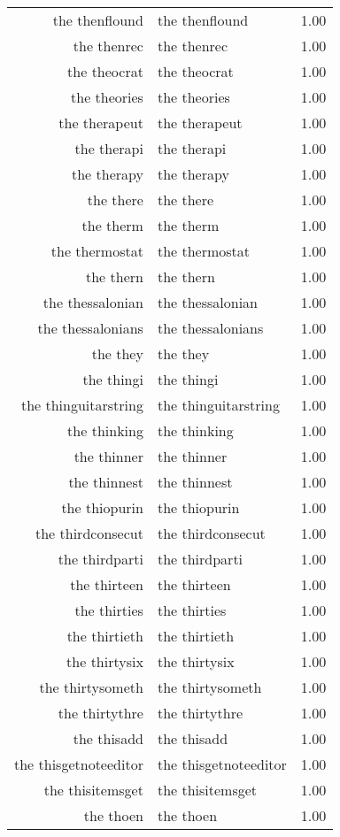 \begin{table}[ht]
\begin{tabular}{rlr}
  the thenflound & the thenflound & 1.00 \\ 
  the thenrec & the thenrec & 1.00 \\ 
  the theocrat & the theocrat & 1.00 \\ 
  the theories & the theories & 1.00 \\ 
  the therapeut & the therapeut & 1.00 \\ 
  the therapi & the therapi & 1.00 \\ 
  the therapy & the therapy & 1.00 \\ 
  the there & the there & 1.00 \\ 
  the therm & the therm & 1.00 \\ 
  the thermostat & the thermostat & 1.00 \\ 
  the thern & the thern & 1.00 \\ 
  the thessalonian & the thessalonian & 1.00 \\ 
  the thessalonians & the thessalonians & 1.00 \\ 
  the they & the they & 1.00 \\ 
  the thingi & the thingi & 1.00 \\ 
  the thinguitarstring & the thinguitarstring & 1.00 \\ 
  the thinking & the thinking & 1.00 \\ 
  the thinner & the thinner & 1.00 \\ 
  the thinnest & the thinnest & 1.00 \\ 
  the thiopurin & the thiopurin & 1.00 \\ 
  the thirdconsecut & the thirdconsecut & 1.00 \\ 
  the thirdparti & the thirdparti & 1.00 \\ 
  the thirteen & the thirteen & 1.00 \\ 
  the thirties & the thirties & 1.00 \\ 
  the thirtieth & the thirtieth & 1.00 \\ 
  the thirtysix & the thirtysix & 1.00 \\ 
  the thirtysometh & the thirtysometh & 1.00 \\ 
  the thirtythre & the thirtythre & 1.00 \\ 
  the thisadd & the thisadd & 1.00 \\ 
  the thisgetnoteeditor & the thisgetnoteeditor & 1.00 \\ 
  the thisitemsget & the thisitemsget & 1.00 \\ 
  the thoen & the thoen & 1.00 \\ 

\end{tabular}
\end{table}

